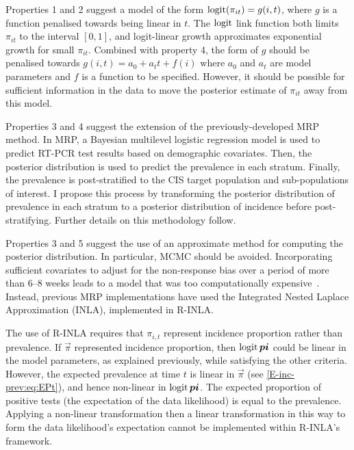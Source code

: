 \documentclass[thesis.tex]{subfiles}
\begin{document}
Properties 1 and 2 suggest a model of the form $\operatorname{logit}(\pi_{it}) = g(i, t)$, where $g$ is a function penalised towards being linear in $t$.
The $\operatorname{logit}$ link function both limits $\pi_{it}$ to the interval $[0, 1]$, and logit-linear growth approximates exponential growth for small $\pi_{it}$.
Combined with property 4, the form of $g$ should be penalised towards $g(i, t) = a_0 + a_t t + f(i)$ where $a_0$ and $a_t$ are model parameters and $f$ is a function to be specified.
However, it should be possible for sufficient information in the data to move the posterior estimate of $\pi_{it}$ away from this model.

Properties 3 and 4 suggest the extension of the previously-developed MRP method.
In MRP, a Bayesian multilevel logistic regression model is used to predict RT-PCR test results based on demographic covariates.
Then, the posterior distribution is used to predict the prevalence in each stratum.
Finally, the prevalence is post-stratified to the CIS target population and sub-populations of interest.
I propose this process by transforming the posterior distribution of prevalence in each stratum to a posterior distribution of incidence before post-stratifying.
Further details on this methodology follow.

Properties 3 and 5 suggest the use of an approximate method for computing the posterior distribution.
In particular, MCMC should be avoided.
Incorporating sufficient covariates to adjust for the non-response bias over a period of more than 6--8 weeks leads to a model that was too computationally expensive~.
Instead, previous MRP implementations have used the Integrated Nested Laplace Approximation (INLA), implemented in R-INLA.

The use of R-INLA requires that $\pi_{i,t}$ represent incidence proportion rather than prevalence.
If $\vec{\pi}$ represented incidence proportion, then $\operatorname{logit} \bm{pi}$ could be linear in the model parameters, as explained previously, while satisfying the other criteria.
However, the expected prevalence at time $t$ is linear in $\vec{\pi}$ (see \cref{E-inc-prev:eq:EPt}), and hence non-linear in $\operatorname{logit} \bm{pi}$.
The expected proportion of positive tests (\ie the expectation of the data likelihood) is equal to the prevalence.
Applying a non-linear transformation then a linear transformation in this way to form the data likelihood's expectation cannot be implemented within R-INLA's framework.
\end{document}
